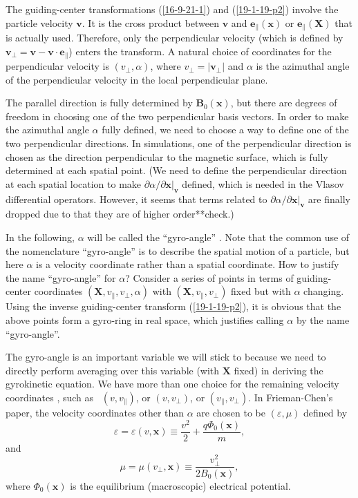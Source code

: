 \documentclass{llncs}
\newcommand{\nobracket}{}
\newcommand{\tmmathbf}[1]{\ensuremath{\boldsymbol{#1}}}
\begin{document}
The guiding-center transformations (\ref{16-9-21-1}) and (\ref{19-1-19-p2})
involve the particle velocity $\mathbf{v}$. It is the cross product between
$\mathbf{v}$ and $\tmmathbf{e}_{\parallel} (\mathbf{x})$ or
$\tmmathbf{e}_{\parallel} (\mathbf{X})$ that is actually used. Therefore, only
the perpendicular velocity (which is defined by $\mathbf{v}_{\perp}
=\mathbf{v}-\mathbf{v} \cdot \mathbf{e}_{\parallel}$) enters the transform. A
natural choice of coordinates for the perpendicular velocity is $(v_{\perp},
\alpha)$, where $v_{\perp} = | \mathbf{v}_{\perp} |$ and $\alpha$ is the
azimuthal angle of the perpendicular velocity in the local perpendicular
plane.

The parallel direction is fully determined by $\mathbf{B}_0 (\mathbf{x})$, but
there are degrees of freedom in choosing one of the two perpendicular basis
vectors. In order to make the azimuthal angle $\alpha$ fully defined, we need
to choose a way to define one of the two perpendicular directions. In
{} simulations, one of the perpendicular direction is chosen as
the direction perpendicular to the magnetic surface, which is fully determined
at each spatial point. (We need to define the perpendicular direction at each
spatial location to make $\partial \alpha / \partial \mathbf{x} |_{\mathbf{v}}
\nobracket$ defined, which is needed in the Vlasov differential operators.
However, it seems that terms related to $\partial \alpha / \partial \mathbf{x}
|_{\mathbf{v}} \nobracket$ are finally dropped due to that they are of higher
order**check.)

In the following, $\alpha$ will be called the ``gyro-angle'' . Note that the
common use of the nomenclature ``gyro-angle'' is to describe the spatial
motion of a particle, but here $\alpha$ is a velocity coordinate rather than a
spatial coordinate. How to justify the name ``gyro-angle'' for $\alpha$?
Consider a series of points in terms of guiding-center coordinates
$(\mathbf{X}, v_{\parallel}, v_{\perp}, \alpha)$ with $(\mathbf{X},
v_{\parallel}, v_{\perp})$ fixed but with $\alpha$ changing. Using the inverse
guiding-center transform (\ref{19-1-19-p2}), it is obvious that the above
points form a gyro-ring in real space, which justifies calling $\alpha$ by the
name ``gyro-angle''.

The gyro-angle is an important variable we will stick to because we need to
directly perform averaging over this variable (with $\mathbf{X}$ fixed) in
deriving the gyrokinetic equation. We have more than one choice for the
remaining velocity coordinates , such as \ $(v, v_{\parallel})$, or $(v,
v_{\perp})$, or $(v_{\parallel}, v_{\perp})$. In Frieman-Chen's paper, the
velocity coordinates other than $\alpha$ are chosen to be $(\varepsilon, \mu)$
defined by
\begin{equation}
  \varepsilon = \varepsilon (v, \mathbf{x}) \equiv \frac{v^2}{2} + \frac{q
  \Phi_0 (\mathbf{x})}{m},
\end{equation}
and
\begin{equation}
  \mu = \mu (v_{\perp}, \mathbf{x}) \equiv \frac{v_{\perp}^2}{2 B_0
  (\mathbf{x})},
\end{equation}
where $\Phi_0 (\mathbf{x})$ is the equilibrium (macroscopic) electrical
potential.
\end{document}
